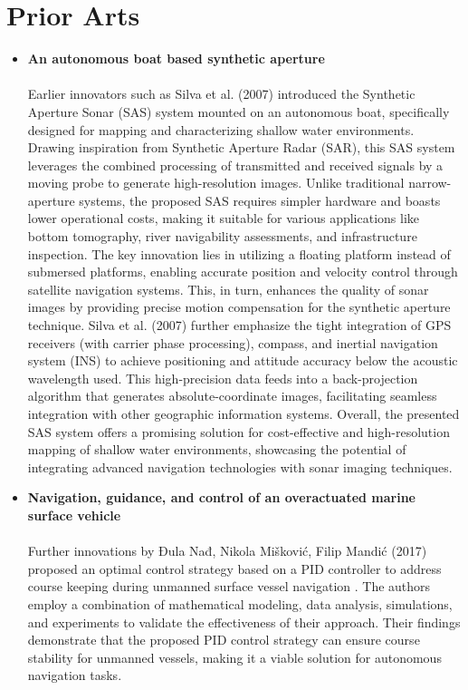 \section{Prior Arts}
\begin{itemize}
  \item {\bf An autonomous boat based synthetic aperture}
  \paragraph{} Earlier innovators such as Silva et al. (2007) introduced the Synthetic Aperture Sonar (SAS) system mounted on an 
              autonomous boat, specifically designed for mapping and characterizing shallow water environments. Drawing inspiration 
              from Synthetic Aperture Radar (SAR), this SAS system leverages the combined processing of transmitted and received 
              signals by a moving probe to generate high-resolution images. Unlike traditional narrow-aperture systems, the proposed 
              SAS requires simpler hardware and boasts lower operational costs, making it suitable for various applications like 
              bottom tomography, river navigability assessments, and infrastructure inspection. The key innovation lies in utilizing 
              a floating platform instead of submersed platforms, enabling accurate position and velocity control through satellite 
              navigation systems. This, in turn, enhances the quality of sonar images by providing precise motion compensation for 
              the synthetic aperture technique. Silva et al. (2007) further emphasize the tight integration of GPS receivers (with 
              carrier phase processing), compass, and inertial navigation system (INS) to achieve positioning and attitude accuracy 
              below the acoustic wavelength used. This high-precision data feeds into a back-projection algorithm that generates 
              absolute-coordinate images, facilitating seamless integration with other geographic information systems. Overall, the 
              presented SAS system offers a promising solution for cost-effective and high-resolution mapping of shallow water 
              environments, showcasing the potential of integrating advanced navigation technologies with sonar imaging techniques.
  \newpage
  \item {\bf Navigation, guidance, and control of an overactuated marine surface vehicle}
  \paragraph{} Further innovations by Đula Nađ, Nikola Mišković, Filip Mandić (2017) proposed an optimal control strategy based on a 
              PID controller to address course keeping during unmanned surface vessel navigation . The authors employ a combination 
              of mathematical modeling, data analysis, simulations, and experiments to validate the effectiveness of their approach. 
              Their findings demonstrate that the proposed PID control strategy can ensure course stability for unmanned vessels, 
              making it a viable solution for autonomous navigation tasks.


\end{itemize}
